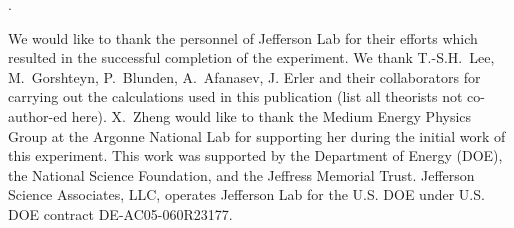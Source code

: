 \documentclass[12pt]{article}
\newcounter{lastnote}
\newenvironment{scilastnote}{%
\setcounter{lastnote}{\value{enumiv}}%
\addtocounter{lastnote}{+1}%
\begin{list}%
{\arabic{lastnote}.}
{\setlength{\leftmargin}{.22in}}
{\setlength{\labelsep}{.5em}}}
{\end{list}}
\begin{document}

%



%
%
%
%
%

%
\begin{thebibliography}{99} 

\end{thebibliography}




\begin{scilastnote}
\item 
We would like to thank the personnel of Jefferson Lab for their efforts which 
resulted in the successful completion of the experiment.
We thank T.-S.H.~Lee, M.~Gorshteyn, P.~Blunden, A.~Afanasev, J. Erler 
and their collaborators for carrying out the calculations used in this publication (list all
theorists not co-author-ed here). 
X.~Zheng would like to thank the Medium Energy Physics Group at the Argonne National 
Lab for supporting her during the initial work of this experiment. 
This work was supported by the Department of Energy (DOE), 
the National Science Foundation,
and the Jeffress Memorial Trust. 
Jefferson Science Associates, LLC,  operates Jefferson Lab for the U.S. DOE under U.S. DOE 
contract DE-AC05-060R23177.
\end{scilastnote}




\end{document}
